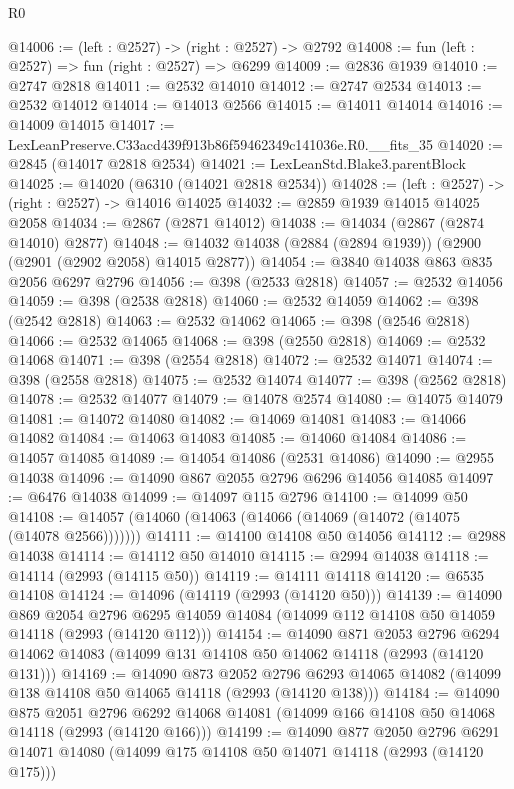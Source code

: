 \begin{lexlean}{R0}
\begin{coremodule}
@14006 := (left : @2527) -> (right : @2527) -> @2792
@14008 := fun (left : @2527) => fun (right : @2527) => @6299
@14009 := @2836 @1939
@14010 := @2747 @2818
@14011 := @2532 @14010
@14012 := @2747 @2534
@14013 := @2532 @14012
@14014 := @14013 @2566
@14015 := @14011 @14014
@14016 := @14009 @14015
@14017 := LexLeanPreserve.C33acd439f913b86f59462349c141036e.R0.__fits_35
@14020 := @2845 (@14017 @2818 @2534)
@14021 := LexLeanStd.Blake3.parentBlock
@14025 := @14020 (@6310 (@14021 @2818 @2534))
@14028 := (left : @2527) -> (right : @2527) -> @14016 @14025
@14032 := @2859 @1939 @14015 @14025 @2058
@14034 := @2867 (@2871 @14012)
@14038 := @14034 (@2867 (@2874 @14010) @2877)
@14048 := @14032 @14038 (@2884 (@2894 @1939)) (@2900 (@2901 (@2902 @2058) @14015 @2877))
@14054 := @3840 @14038 @863 @835 @2056 @6297 @2796
@14056 := @398 (@2533 @2818)
@14057 := @2532 @14056
@14059 := @398 (@2538 @2818)
@14060 := @2532 @14059
@14062 := @398 (@2542 @2818)
@14063 := @2532 @14062
@14065 := @398 (@2546 @2818)
@14066 := @2532 @14065
@14068 := @398 (@2550 @2818)
@14069 := @2532 @14068
@14071 := @398 (@2554 @2818)
@14072 := @2532 @14071
@14074 := @398 (@2558 @2818)
@14075 := @2532 @14074
@14077 := @398 (@2562 @2818)
@14078 := @2532 @14077
@14079 := @14078 @2574
@14080 := @14075 @14079
@14081 := @14072 @14080
@14082 := @14069 @14081
@14083 := @14066 @14082
@14084 := @14063 @14083
@14085 := @14060 @14084
@14086 := @14057 @14085
@14089 := @14054 @14086 (@2531 @14086)
@14090 := @2955 @14038
@14096 := @14090 @867 @2055 @2796 @6296 @14056 @14085
@14097 := @6476 @14038
@14099 := @14097 @115 @2796
@14100 := @14099 @50
@14108 := @14057 (@14060 (@14063 (@14066 (@14069 (@14072 (@14075 (@14078 @2566)))))))
@14111 := @14100 @14108 @50 @14056
@14112 := @2988 @14038
@14114 := @14112 @50 @14010
@14115 := @2994 @14038
@14118 := @14114 (@2993 (@14115 @50))
@14119 := @14111 @14118
@14120 := @6535 @14108
@14124 := @14096 (@14119 (@2993 (@14120 @50)))
@14139 := @14090
    @869
    @2054
    @2796
    @6295
    @14059
    @14084
    (@14099 @112 @14108 @50 @14059 @14118 (@2993 (@14120 @112)))
@14154 := @14090
    @871
    @2053
    @2796
    @6294
    @14062
    @14083
    (@14099 @131 @14108 @50 @14062 @14118 (@2993 (@14120 @131)))
@14169 := @14090
    @873
    @2052
    @2796
    @6293
    @14065
    @14082
    (@14099 @138 @14108 @50 @14065 @14118 (@2993 (@14120 @138)))
@14184 := @14090
    @875
    @2051
    @2796
    @6292
    @14068
    @14081
    (@14099 @166 @14108 @50 @14068 @14118 (@2993 (@14120 @166)))
@14199 := @14090
    @877
    @2050
    @2796
    @6291
    @14071
    @14080
    (@14099 @175 @14108 @50 @14071 @14118 (@2993 (@14120 @175)))

\end{coremodule}
\end{lexlean}
